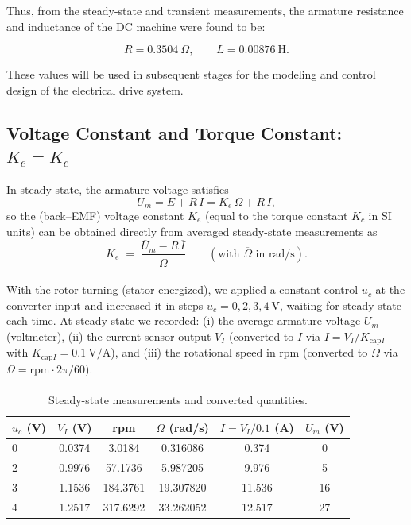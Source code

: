 \documentclass{rapportCS}
\begin{document}
Thus, from the steady-state and transient measurements, the armature resistance and inductance of the DC machine were found to be:

\[
R = 0.3504~\Omega, \qquad L = 0.00876~\mathrm{H}.
\]

These values will be used in subsequent stages for the modeling and control design of the electrical drive system.

\subsection{Voltage Constant and Torque Constant: $K_e = K_c$}

In steady state, the armature voltage satisfies
\[
U_m = E + R\,I = K_e\,\Omega + R\,I,
\]
so the (back–EMF) voltage constant $K_e$ (equal to the torque constant $K_c$ in SI units) can be obtained directly from averaged steady-state measurements as
\[
K_e \;=\; \frac{\overline{U}_m - R\,\overline{I}}{\overline{\Omega}} \qquad (\text{with } \overline{\Omega}\text{ in rad/s}).
\]


\paragraph{}
With the rotor turning (stator energized), we applied a constant control $u_c$ at the converter input and increased it in steps $u_c=0,2,3,4~\mathrm{V}$, waiting for steady state each time. At steady state we recorded:
(i) the average armature voltage $U_m$ (voltmeter),
(ii) the current sensor output $V_I$ (converted to $I$ via $I=V_I/K_{\mathrm{cap}I}$ with $K_{\mathrm{cap}I}=0.1~\mathrm{V/A}$),
and (iii) the rotational speed in rpm (converted to $\Omega$ via $\Omega= \text{rpm}\cdot 2\pi/60$).

\paragraph{}
\begin{table}[H]
\centering
\caption{Steady-state measurements and converted quantities.}
\label{tab:Ke_data}
\begin{tabular}{lccccc}
\toprule
$u_c$ (V) & $V_I$ (V) & rpm & $\Omega$ (rad/s) & $I=V_I/0.1$ (A) & $U_m$ (V)\\
\midrule
0 & 0.0374 & 3.0184  & 0.316086 & 0.374  & 0 \\
2 & 0.9976 & 57.1736 & 5.987205 & 9.976  & 5 \\
3 & 1.1536 & 184.3761& 19.307820& 11.536 & 16 \\
4 & 1.2517 & 317.6292& 33.262052& 12.517 & 27 \\
\bottomrule
\end{tabular}
\end{table}
\end{document}
